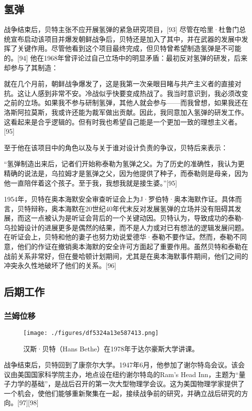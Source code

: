 \subsection{氢弹}
战争结束后，贝特主张不应开展氢弹的紧急研究项目，[93] 尽管在哈里·杜鲁门总统宣布启动该项目并爆发朝鲜战争后，贝特还是加入了其中，并在武器的发展中发挥了关键作用。尽管他看到这个项目最终完成，但贝特曾希望制造氢弹是不可能的。[94] 他在1968年曾评论过自己立场中的明显矛盾：最初反对氢弹的研发，后来却参与了其制造：

就在几个月前，朝鲜战争爆发了，这是我第一次亲眼目睹与共产主义者的直接对抗。这让人感到非常不安。冷战似乎快要变成热战了。我当时意识到，我必须改变之前的立场。如果我不参与研制氢弹，其他人就会参与——而我曾想，如果我还在洛斯阿拉莫斯，我或许还能为裁军做出贡献。因此，我同意加入氢弹的研发工作。这看起来是合乎逻辑的。但有时我也希望自己能是一个更加一致的理想主义者。[95]

至于他在该项目中的角色以及与关于谁对设计负责的争议，贝特后来表示：

“氢弹制造出来后，记者们开始称泰勒为氢弹之父。为了历史的准确性，我认为更精确的说法是，乌拉姆才是氢弹之父，因为他提供了种子，而泰勒则是母亲，因为他一直陪伴着这个孩子。至于我，我想我就是接生婆。”[95]

1954年，贝特在奥本海默安全审查听证会上为J·罗伯特·奥本海默作证。具体而言，贝特辩称，奥本海默在20世纪40年代末反对发展氢弹的立场并没有阻碍其发展，而这一点被认为是听证会背后的一个关键动因。贝特认为，导致成功的泰勒-乌拉姆设计的进展更多是偶然的结果，而不是人力或对已有想法的逻辑发展问题。在听证会上，贝特和他的妻子也努力劝说爱德华·泰勒不要作证。然而，泰勒不同意，他们的作证在撤销奥本海默的安全许可方面起了重要作用。虽然贝特和泰勒在战前关系非常好，但在曼哈顿计划期间，尤其是在奥本海默事件期间，他们之间的冲突永久性地破坏了他们的关系。[96]
\subsection{后期工作}  
\subsubsection{兰姆位移}
\begin{figure}[ht]
\centering
\texttt{[image: ./figures/df5324a13e587413.png]}
\caption{汉斯·贝特（Hans Bethe）在1978年于达尔豪斯大学讲课。} \label{fig_Hans_5}
\end{figure}
战争结束后，贝特回到了康奈尔大学。1947年6月，他参加了谢尔特岛会议。该会议由美国国家科学院主办，地点设在纽约谢尔特岛的Ram's Head Inn，主题为“量子力学的基础”，是战后召开的第一次大型物理学会议。这为美国物理学家提供了一个机会，使他们能够重新聚集在一起，接续战争前的研究，并确立战后研究的方向。[97][98]

